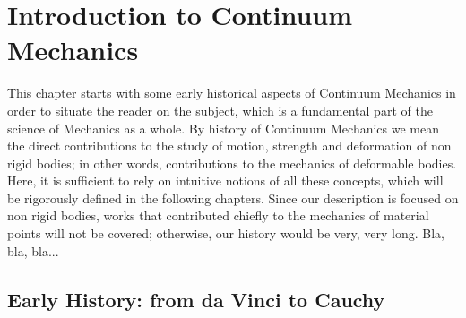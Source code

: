 \chapter{Introduction to Continuum Mechanics}\label{ch:IntroCM}


This chapter starts with some early historical aspects of Continuum Mechanics in order to situate the reader on the subject, which is a fundamental part of the science of Mechanics as a whole. By history of Continuum Mechanics we mean the direct contributions to the study of motion, strength and deformation of non rigid bodies; in other words, contributions to the mechanics of deformable bodies. Here, it is sufficient to rely on intuitive notions of all these concepts, which will be rigorously defined in the following chapters. Since our description is focused on non rigid bodies, works that contributed chiefly to the mechanics of material points will not be covered; otherwise, our history would be very, very long. Bla, bla, bla... 


\section{Early History: from da Vinci to Cauchy}


